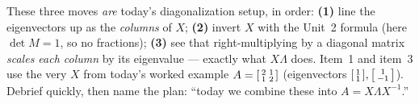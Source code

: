 \documentclass[10pt]{article}
\begin{document}
\begin{teachernote}
These three moves \emph{are} today's diagonalization setup, in order: \textbf{(1)} line the eigenvectors up
as the \emph{columns} of $X$; \textbf{(2)} invert $X$ with the Unit~2 formula (here $\det M=1$, so no
fractions); \textbf{(3)} see that right-multiplying by a diagonal matrix \emph{scales each column} by its
eigenvalue --- exactly what $X\Lambda$ does. Item~1 and item~3 use the very $X$ from today's worked example
$A=\begin{bsmallmatrix}2&1\\1&2\end{bsmallmatrix}$ (eigenvectors $\begin{bsmallmatrix}1\\1\end{bsmallmatrix},
\begin{bsmallmatrix}1\\-1\end{bsmallmatrix}$). Debrief quickly, then name the plan: ``today we combine these
into $A=X\Lambda X^{-1}$.''
\end{teachernote}
\end{document}
